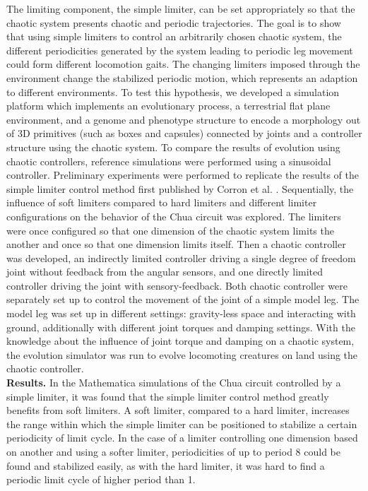 \documentclass[11pt, a4paper, oneside]{Thesis} %
\begin{document}
{%
The limiting component, the simple limiter, can be set appropriately so that the chaotic system presents chaotic and periodic trajectories. %
%
The goal is to show that using simple limiters to control an arbitrarily chosen chaotic system, the different periodicities generated by the system leading to periodic leg movement could form different locomotion gaits. %
%
The changing limiters imposed through the environment change the stabilized periodic motion, which represents an adaption to different environments. %
%
To test this hypothesis, we developed a simulation platform which implements an evolutionary process, a terrestrial flat plane environment, and a genome and phenotype structure to encode a morphology out of 3D primitives (such as boxes and capsules) connected by joints and a controller structure using the chaotic system. %
%
To compare the results of evolution using chaotic controllers, reference simulations were performed using a sinusoidal controller. %
%
Preliminary experiments were performed to replicate the results of the simple limiter control method first published by Corron et al. \cite{bib:Corron2000}. %
%
Sequentially, the influence of soft limiters compared to hard limiters and different limiter configurations on the behavior of the Chua circuit was explored. %
%
The limiters were once configured so that one dimension of the chaotic system limits the another and once so that one dimension limits itself. %
%
Then a chaotic controller was developed, an indirectly limited controller driving a single degree of freedom joint without feedback from the angular sensors, and one directly limited controller driving the joint with sensory-feedback. %
%
Both chaotic controller were separately set up to control the movement of the joint of a simple model leg. %
%
The model leg was set up in different settings: gravity-less space and interacting with ground, additionally with different joint torques and damping settings. %
%
With the knowledge about the influence of joint torque and damping on a chaotic system, the evolution simulator was run to evolve locomoting creatures on land using the chaotic controller. \\
%
%
\textbf{Results.} In the Mathematica simulations of the Chua circuit controlled by a simple limiter, it was found that the simple limiter control method greatly benefits from soft limiters. %
%
A soft limiter, compared to a hard limiter, increases the range within which the simple limiter can be positioned to stabilize a certain periodicity of limit cycle. %
%
In the case of a limiter controlling one dimension based on another and using a softer limiter, periodicities of up to period 8 could be found and stabilized easily, as with the hard limiter, it was hard to find a periodic limit cycle of higher period than 1. %
}
\end{document}
